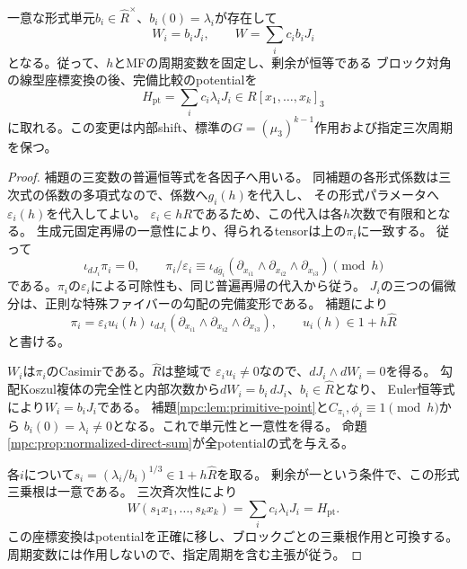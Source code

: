 \begin{proposition}[各復元ブロックと点三次の全次数比較]
\label{mpc:prop:exact-point-potential}
一意な形式単元$b_i\in\widehat R^\times$、$b_i(0)=\lambda_i$が存在して
\begin{equation}\label{mpc:eq:exact-potential}
 W_i=b_iJ_i,
 \qquad W=\sum_i c_ib_iJ_i
\end{equation}
となる。従って、$h$とMFの周期変数を固定し、剰余が恒等である
ブロック対角の線型座標変換の後、完備比較のpotentialを
\begin{equation}\label{mpc:eq:algebraic-potential}
 H_{\mathrm{pt}}=\sum_i c_i\lambda_iJ_i\in R[x_1,\ldots,x_k]_3
\end{equation}
に取れる。この変更は内部shift、標準の$G=(\mu_3)^{k-1}$作用および指定三次周期を保つ。
\end{proposition}
\begin{proof}
補題の三変数の普遍恒等式を各因子へ用いる。
同補題の各形式係数は三次式の係数の多項式なので、係数へ$g_i(h)$を代入し、
その形式パラメータへ$\varepsilon_i(h)$を代入してよい。
$\varepsilon_i\in hR$であるため、この代入は各$h$次数で有限和となる。
生成元固定再帰の一意性により、得られるtensorは上の$\pi_i$に一致する。
従って
\[
 \iota_{dJ_i}\pi_i=0,
 \qquad \pi_i/\varepsilon_i\equiv
 \iota_{d\overline g_i}
 (\partial_{x_{i1}}\wedge\partial_{x_{i2}}\wedge\partial_{x_{i3}})
 \pmod h
\]
である。$\pi_i$の$\varepsilon_i$による可除性も、同じ普遍再帰の代入から従う。
$J_i$の三つの偏微分は、正則な特殊ファイバーの勾配の完備変形である。
補題により
\[
 \pi_i=\varepsilon_i u_i(h)\,\iota_{dJ_i}
 (\partial_{x_{i1}}\wedge\partial_{x_{i2}}\wedge\partial_{x_{i3}}),
 \qquad u_i(h)\in1+h\widehat R
\]
と書ける。

$W_i$は$\pi_i$のCasimirである。$\widehat R$は整域で
$\varepsilon_i u_i\ne0$なので、$dJ_i\wedge dW_i=0$を得る。
勾配Koszul複体の完全性と内部次数から$dW_i=b_i\,dJ_i$、$b_i\in\widehat R$となり、
Euler恒等式により$W_i=b_iJ_i$である。
補題\ref{mpc:lem:primitive-point}と$C_{\pi_i},\phi_i\equiv1\pmod h$から
$b_i(0)=\lambda_i\ne0$となる。これで単元性と一意性を得る。
命題\ref{mpc:prop:normalized-direct-sum}が全potentialの式を与える。

各$i$について$s_i=(\lambda_i/b_i)^{1/3}\in1+h\widehat R$を取る。
剰余が一という条件で、この形式三乗根は一意である。
三次斉次性により
\[
 W(s_1x_1,\ldots,s_kx_k)=\sum_i c_i\lambda_iJ_i=H_{\mathrm{pt}}.
\]
この座標変換はpotentialを正確に移し、ブロックごとの三乗根作用と可換する。
周期変数には作用しないので、指定周期を含む主張が従う。
\end{proof}

